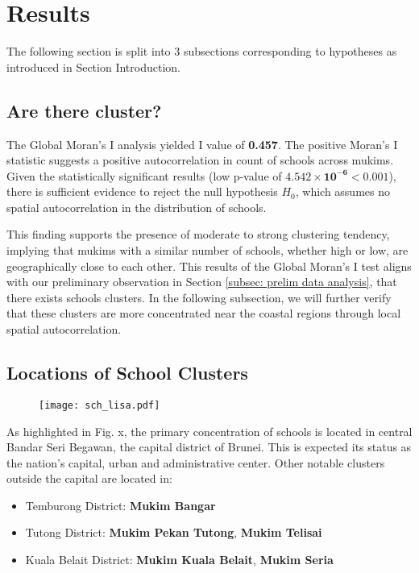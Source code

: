 \documentclass[12pt]{article}
\begin{document}
\section{Results}
\label{sec: results}
The following section is split into 3 subsections corresponding to hypotheses as introduced in Section Introduction.

\subsection{Are there cluster?}
The Global Moran's I analysis yielded I value of \textbf{0.457}. The positive Moran’s I statistic suggests a positive autocorrelation in count of schools across mukims. Given the statistically significant results (low p-value of $\mathbf{4.542 \times 10^{-6}} < 0.001$), there is sufficient evidence to reject the null hypothesis $H_0$, which assumes no spatial autocorrelation in the distribution of schools. 

This finding supports the presence of moderate to strong clustering tendency, implying that mukims with a similar number of schools, whether high or low, are geographically close to each other. This results of the Global Moran’s I test aligns with our preliminary observation in Section \ref{subsec: prelim data analysis}, that there exists schools clusters. In the following subsection, we will further verify that these clusters are more concentrated near the coastal regions through local spatial autocorrelation.

\subsection{Locations of School Clusters}
\begin{figure}[htbp]
\centering
\texttt{[image: sch\_lisa.pdf]}
\end{figure} 

As highlighted in Fig. x, the primary concentration of schools is located in central Bandar Seri Begawan, the capital district of Brunei. This is expected its status as the nation’s capital, urban and administrative center. Other notable clusters outside the capital are located in:
\begin{itemize}
    \item Temburong District: \textbf{Mukim Bangar}
    \item Tutong District: \textbf{Mukim Pekan Tutong}, \textbf{Mukim Telisai}
    \item Kuala Belait District: \textbf{Mukim Kuala Belait}, \textbf{Mukim Seria}
\end{itemize}
\end{document}
